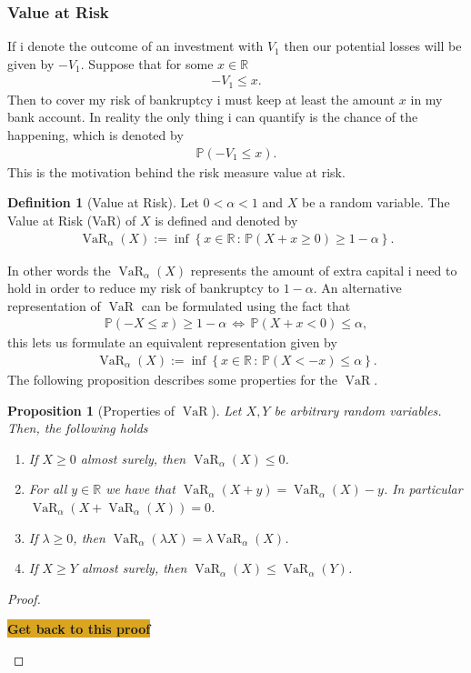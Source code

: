 \documentclass{article}
\newtheorem{proposition}[theorem]{Proposition}
\theoremstyle{definition}
\newtheorem{definition}[theorem]{Definition}
\numberwithin{equation}{section}
\DeclareMathOperator{\VaR}{VaR}
\newcommand{\commentcolor}{Goldenrod}
\newcommand{\comment}[1]{
    \begin{center}
        \colorbox{\commentcolor}{
            \textsf{
                \textbf{#1}
            }
        }
    \end{center}
}
\begin{document}
\subsubsection{Value at Risk}
If i denote the outcome of an investment with $V_1$ then our potential losses will be given by $-V_1$.
Suppose that for some $x \in \mathbb{R}$
\begin{align}
    -V_1 \leq x.
\end{align}
Then to cover my risk of bankruptcy i must keep at least the amount $x$ in my bank account.
In reality the only thing i can quantify is the chance of the happening, which is denoted by
\begin{align}
    \mathbb{P}\left( -V_1 \leq x \right).
\end{align}
This is the motivation behind the risk measure value at risk.
\begin{definition}[Value at Risk]
    Let $0 < \alpha < 1$ and $X$ be a random variable.
    The Value at Risk (VaR) of $X$ is defined and denoted by
    \begin{align}
        \VaR_\alpha(X) := \inf
        \left\{
            x \in \mathbb{R} \, : \,
            \mathbb{P}(X + x \geq 0)
            \geq 1 - \alpha
        \right\}.
    \end{align}
\end{definition}
In other words the $\VaR_\alpha(X)$ represents the amount of extra capital i need to hold in order to reduce my risk of bankruptcy to $1 - \alpha$.
An alternative representation of $\VaR$ can be formulated using the fact that
\begin{align}
    \mathbb{P}(-X \leq x) \geq 1 - \alpha
    \, \Longleftrightarrow \,
    \mathbb{P}(X + x < 0) \leq \alpha,
\end{align}
this lets us formulate an equivalent representation given by
\begin{align}
    \VaR_\alpha(X) := \inf
    \left\{
        x \in \mathbb{R} \, : \,
        \mathbb{P}(X < -x) \leq \alpha
    \right\}.
\end{align}
The following proposition describes some properties for the $\VaR$.
\begin{proposition}[Properties of $\VaR$]
    Let $X, Y$ be arbitrary random variables.
    Then, the following holds
    \begin{enumerate}
        \item If $X \geq 0$ almost surely, then $\VaR_\alpha(X) \leq 0$.
        \item For all $y\in \mathbb{R}$ we have that $\VaR_\alpha(X + y) = \VaR_\alpha(X) - y$. In particular $\VaR_\alpha(X + \VaR_\alpha(X)) = 0$.
        \item If $\lambda \geq 0$, then $\VaR_\alpha(\lambda X) = \lambda \VaR_\alpha(X)$.
        \item If $X \geq Y$ almost surely, then $\VaR_\alpha(X) \leq \VaR_\alpha(Y)$.
    \end{enumerate}
\end{proposition}
\begin{proof}
    \comment{Get back to this proof}
\end{proof}
\end{document}
